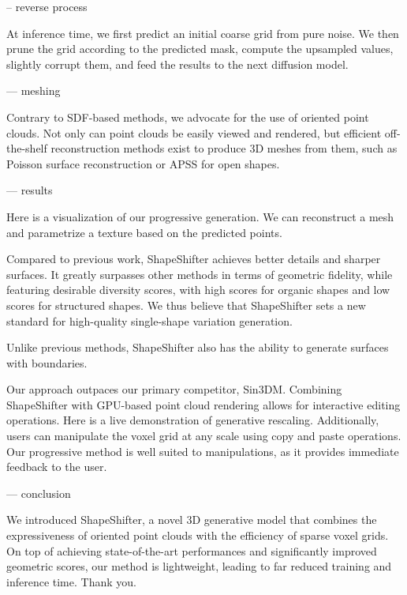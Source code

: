-- reverse process

At inference time, we first predict an initial coarse grid from pure noise. We then prune the grid according to the predicted mask, compute the upsampled values, slightly corrupt them, and feed the results to the next diffusion model.

--- meshing

Contrary to SDF-based methods, we advocate for the use of oriented point clouds. Not only can point clouds be easily viewed and rendered, but efficient off-the-shelf reconstruction methods exist to produce 3D meshes from them, such as Poisson surface reconstruction or APSS for open shapes.

--- results


Here is a visualization of our progressive generation. We can reconstruct a mesh and parametrize a texture based on the predicted points.

Compared to previous work, ShapeShifter achieves better details and sharper surfaces. It greatly surpasses other methods in terms of geometric fidelity, while featuring desirable diversity scores, with high scores for organic shapes and low scores for structured shapes. We thus believe that ShapeShifter sets a new standard for high-quality single-shape variation generation.

Unlike previous methods, ShapeShifter also has the ability to generate surfaces with boundaries. 

Our approach outpaces our primary competitor, Sin3DM. Combining ShapeShifter with GPU-based point cloud rendering allows for interactive editing operations. Here is a live demonstration of generative rescaling. Additionally, users can manipulate the voxel grid at any scale using copy and paste operations. Our progressive method is well suited to manipulations,  as it provides immediate feedback to the user. 

--- conclusion

We introduced ShapeShifter, a novel 3D generative model that combines the expressiveness of oriented point clouds with the efficiency of sparse voxel grids. On top of achieving state-of-the-art performances and significantly improved geometric scores, our method is lightweight, leading to far reduced training and inference time. Thank you.
























